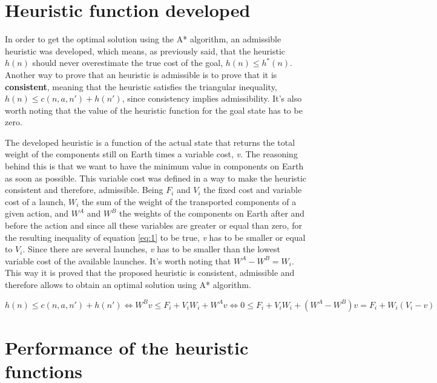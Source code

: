 \documentclass[11pt,a4paper,oneside]{article}
\begin{document}
\section{Heuristic function developed}

In order to get the optimal solution using the A* algorithm, an admissible heuristic was developed, which means, as previously said, that the heuristic $h(n)$ should never overestimate the true cost of the goal, $h(n) \leq h^*(n)$. Another way to prove that an heuristic is admissible is to prove that it is \textbf{consistent}, meaning that the heuristic satisfies the triangular inequality, $h(n) \leq c(n, a, n') + h(n')$, since consistency implies admissibility. It's also worth noting that the value of the heuristic function for the goal state has to be zero.

\hspace{-6mm}The developed heuristic is a function of the actual state that returns the total weight of the components still on Earth times a variable cost, \textit{v}. The reasoning behind this is that we want to have the minimum value in components on Earth as soon as possible. This variable cost was defined in a way to make the heuristic consistent and therefore, admissible. Being $F_i$ and $V_i$ the fixed cost and variable cost of a launch, $W_i$ the sum of the weight of the transported components of a given action, and $W^A$ and $W^B$ the weights of the components on Earth after and before the action and since all these variables are greater or equal than zero, for the resulting inequality of equation \ref{eq:1} to be true, \textit{v} has to be smaller or equal to $V_i$. Since there are several launches, \textit{v} has to be smaller than the lowest variable cost of the available launches. It's worth noting that $W^A - W^B = W_i$. This way it is proved that the proposed heuristic is consistent, admissible and therefore allows to obtain an optimal solution using A* algorithm.

\vspace{-3mm}
\begin{equation}
    h(n) \leq c(n, a, n') + h(n') \Leftrightarrow W^B \textit{v} \leq F_i + V_i W_i + W^A \textit{v} \Leftrightarrow 0 \leq F_i + V_i W_i + (W^A - W^B) \textit{v} = F_i + W_i (V_i - \textit{v})
\label{eq:1}
\end{equation}

\section{Performance of the heuristic functions}
\end{document}
